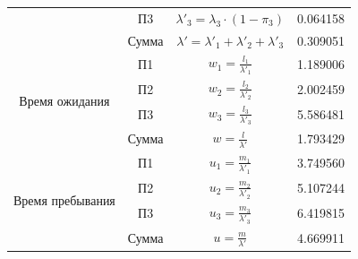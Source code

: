 \begin{adjustbox}{max width=\textwidth}
\begin{tabular}{|c|c|c|c|}
                                    & П3     & $\lambda'_3 = \lambda_3\cdot (1-\pi_3)$                                                                       & 0.064158  \\ \cline{2-4}
                                    & Сумма  & $\lambda' = \lambda'_1+\lambda'_2+\lambda'_3$                                                                 & 0.309051  \\ \hline
\multirow{4}{*}{Время ожидания}     & П1     & $w_1 = \frac{l_1}{\lambda'_1}$                                                                                & 1.189006  \\ \cline{2-4}
                                    & П2     & $w_2 = \frac{l_2}{\lambda'_2}$                                                                                & 2.002459  \\ \cline{2-4}
                                    & П3     & $w_3 = \frac{l_3}{\lambda'_3}$                                                                                & 5.586481  \\ \cline{2-4}
                                    & Сумма  & $w = \frac{l}{\lambda'}$                                                                                      & 1.793429  \\ \hline
\multirow{4}{*}{Время пребывания}   & П1     & $u_1 = \frac{m_1}{\lambda'_1}$                                                                                & 3.749560  \\ \cline{2-4}
                                    & П2     & $u_2 = \frac{m_2}{\lambda'_2}$                                                                                & 5.107244  \\ \cline{2-4}
                                    & П3     & $u_3 = \frac{m_3}{\lambda'_3}$                                                                                & 6.419815  \\ \cline{2-4}
                                    & Сумма  & $u = \frac{m}{\lambda'}$                                                                                      & 4.669911  \\ \hline
\end{tabular}
\end{adjustbox}
